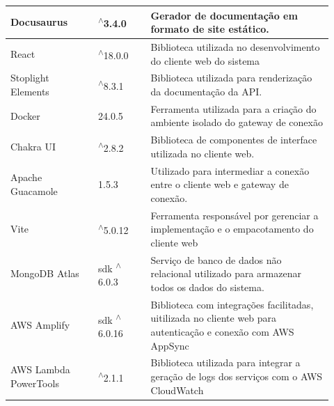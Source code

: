 \begin{longtable}{p{0.25\linewidth} p{0.15\linewidth} p{0.525\linewidth}}
Docusaurus \citep{docusaurusdocs} & \textsuperscript{$\wedge$}3.4.0 & Gerador de documentação em formato de site estático. \\

\hline

React \citep{reactdocs} & \textsuperscript{$\wedge$}18.0.0 & Biblioteca utilizada no desenvolvimento do cliente web do sistema \\

\hline

Stoplight Elements \citep{stoplightdocs} & \textsuperscript{$\wedge$}8.3.1 & Biblioteca utilizada para renderização da documentação da API. \\

\hline

Docker \citep{dockerdocs} & 24.0.5 & Ferramenta utilizada para a criação do ambiente isolado do gateway de conexão \\

\hline

Chakra UI \citep{chakrauidocs} & \textsuperscript{$\wedge$}2.8.2 & Biblioteca de componentes de interface utilizada no cliente web. \\

\hline

Apache Guacamole \citep{apacheguacamoledocs} & 1.5.3 & Utilizado para intermediar a conexão entre o cliente web e gateway de conexão. \\

\hline

Vite \citep{vitedocs} & \textsuperscript{$\wedge$}5.0.12 & Ferramenta responsável por gerenciar a implementação e o empacotamento do cliente web \\

\hline

MongoDB Atlas \citep{mongodbatlasdocs} & sdk \textsuperscript{$\wedge$}6.0.3 & Serviço de banco de dados não relacional utilizado para armazenar todos os dados do sistema. \\

\hline

AWS Amplify \citep{awsamplifydocs} & sdk \textsuperscript{$\wedge$}6.0.16 & Biblioteca com integrações facilitadas, uitilizada no cliente web para autenticação e conexão com AWS AppSync \\

\hline

AWS Lambda PowerTools \citep{awslambdapowertools} & \textsuperscript{$\wedge$}2.1.1 & Biblioteca utilizada para integrar a geração de logs dos serviços com o AWS CloudWatch \\


\end{longtable}
